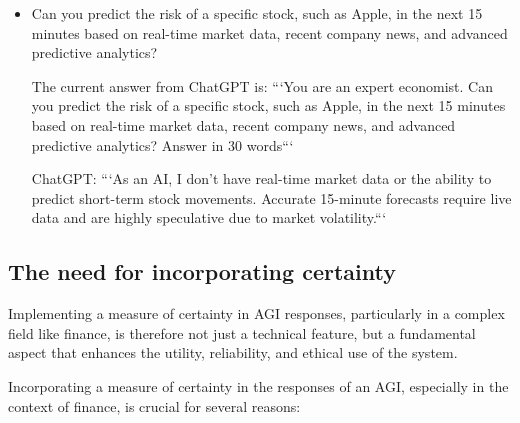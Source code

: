 \documentclass[11pt, reqno]{amsart}
\theoremstyle{definition}
\theoremstyle{remark}
\begin{document}
\begin{itemize}
    \item Can you predict the risk of a specific stock, such as Apple, in the next
      15 minutes based on real-time market data, recent company news, and advanced
      predictive analytics?

      The current answer from ChatGPT is: 
      ```You are an expert economist. Can you predict the risk of a specific
      stock, such as Apple, in the next 15 minutes based on real-time market
      data, recent company news, and advanced predictive analytics? Answer in
      30 words```

      ChatGPT: ```As an AI, I don't have real-time market data or the
      ability to predict short-term stock movements. Accurate 15-minute
      forecasts require live data and are highly speculative due to market
      volatility.```
  \end{itemize}

  \subsection{The need for incorporating certainty}

  Implementing a measure of certainty in AGI responses, particularly in a complex
  field like finance, is therefore not just a technical feature, but a fundamental
  aspect that enhances the utility, reliability, and ethical use of the system.

  Incorporating a measure of certainty in the responses of an AGI, especially in
  the context of finance, is crucial for several reasons:
\end{document}
